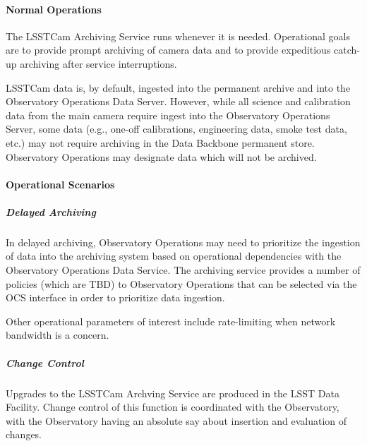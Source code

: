 \paragraph{Normal Operations}

The LSSTCam Archiving Service runs whenever it is needed. Operational goals are
to provide prompt archiving of camera data and to provide expeditious
catch-up archiving after service interruptions.

LSSTCam data is, by default, ingested into the permanent archive
and into the Observatory Operations Data Server. However, while all
science and calibration data from the main camera require ingest into
the Observatory Operations Server, some data (e.g., one-off
calibrations, engineering data, smoke test data, etc.) may not require
archiving in the Data Backbone permanent store. Observatory Operations may
designate data which will not be archived.

\paragraph{Operational Scenarios}

\subparagraph{Delayed Archiving}

In delayed archiving, Observatory Operations may need to prioritize
the ingestion of data into the archiving system based on operational
dependencies with the Observatory Operations Data Service. The
archiving service provides a number of policies (which are TBD) to
Observatory Operations that can be selected via the OCS interface in order to
prioritize data ingestion.

Other operational parameters of interest include rate-limiting when network
bandwidth is a concern.

\subparagraph{Change Control}

Upgrades to the LSSTCam Archving Service are produced in the LSST Data Facility.
Change control of this function is coordinated with the Observatory, with the
Observatory having an absolute say about insertion and evaluation of changes.
